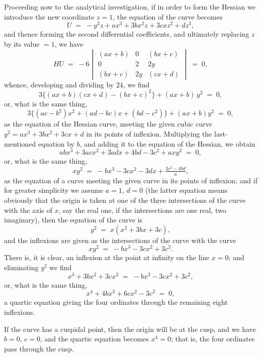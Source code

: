 \documentclass[11pt,a4paper]{article}
\begin{document}
Proceeding now to the analytical investigation, if in order to form the Hessian we introduce the new coordinate $z = 1$, the equation of the curve becomes
\[
U \;=\; -y^2 z + ax^3 + 3bx^2 z + 3cxz^2 + dz^3,
\]
and thence forming the second differential coefficients, and ultimately replacing $z$ by its value $=1$, we have
\[
HU \;=\; -6\begin{vmatrix} (ax+b) & 0 & (bx+c)\\ 0 & 2 & 2y\\ (bx+c) & 2y & (cx+d)\end{vmatrix} \;=\; 0,
\]
whence, developing and dividing by $24$, we find
\[
3\bigl\{(ax+b)(cx+d) - (bx+c)^2\bigr\} + (ax+b)\,y^2 \;=\; 0,
\]
or, what is the same thing,
\[
3\bigl\{(ac - b^2)x^2 + (ad - bc)x + (bd - c^2)\bigr\} + (ax + b)y^2 \;=\; 0,
\]
as the equation of the Hessian curve, meeting the given cubic curve $y^2 = ax^3 + 3bx^2 + 3cx + d$ in its points of inflexion. Multiplying the last-mentioned equation by $b$, and adding it to the equation of the Hessian, we obtain
\[
abx^3 + 3acx^2 + 3adx + 4bd - 3c^2 + ax y^2 \;=\; 0,
\]
or, what is the same thing,
\[
xy^2 \;=\; -bx^3 - 3cx^2 - 3dx + \tfrac{3c^2 - 4bd}{a},
\]
as the equation of a curve meeting the given curve in its points of inflexion; and if for greater simplicity we assume $a = 1$, $d = 0$ (the latter equation means obviously that the origin is taken at one of the three intersections of the curve with the axis of $x$, say the real one, if the intersections are one real, two imaginary), then the equation of the curve is
\[
y^2 \;=\; x(x^2 + 3bx + 3c),
\]
and the inflexions are given as the intersections of the curve with the curve
\[
xy^2 \;=\; -bx^3 - 3cx^2 + 3c^2.
\]
There is, it is clear, an inflexion at the point at infinity on the line $x = 0$; and eliminating $y^2$ we find
\[
x^3 + 3bx^2 + 3cx^2 \;=\; -bx^3 - 3cx^2 + 3c^2,
\]
or, what is the same thing,
\[
x^4 + 4bx^3 + 6cx^2 - 3c^2 \;=\; 0,
\]
a quartic equation giving the four ordinates through the remaining eight inflexions.

\medskip

If the curve has a cuspidal point, then the origin will be at the cusp, and we have $b = 0$, $c = 0$, and the quartic equation becomes $x^4 = 0$; that is, the four ordinates pass through the cusp.

\medskip
\end{document}
